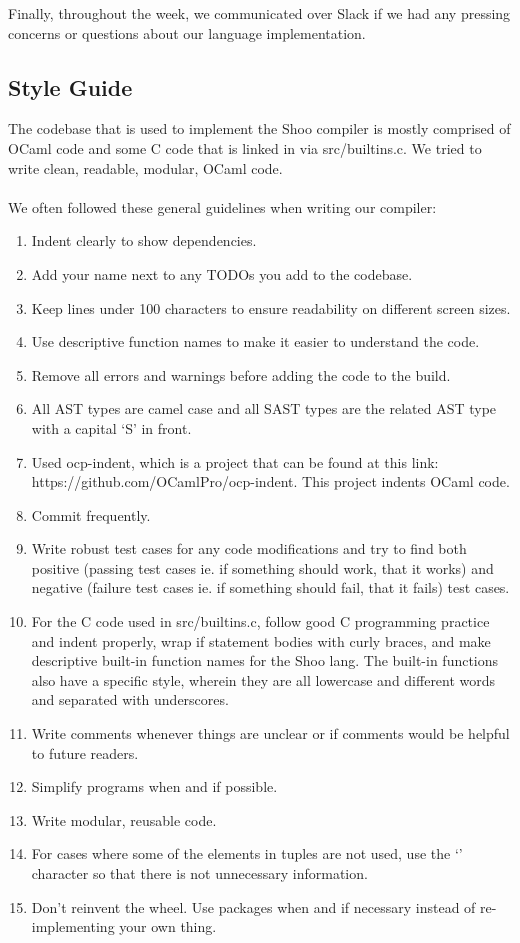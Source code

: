 \documentclass[12pt]{article}
\begin{document}
Finally, throughout the week, we communicated over Slack if we had any pressing concerns or questions about our language implementation. 

\subsection{Style Guide}
The codebase that is used to implement the Shoo compiler is mostly comprised of OCaml code and some C code that is linked in via src/builtins.c. We tried to write clean, readable, modular, OCaml code. 
\\ \\
We often followed these general guidelines when writing our compiler:
\begin{enumerate}
\item Indent clearly to show dependencies.
\item Add your name next to any TODOs you add to the codebase.
\item Keep lines under 100 characters to ensure readability on different screen sizes. 
\item Use descriptive function names to make it easier to understand the code.
\item Remove all errors and warnings before adding the code to the build.
\item All AST types are camel case and all SAST types are the related AST type with a capital ‘S’ in front.
\item Used ocp-indent, which is a project that can be found at this link:
\\ https://github.com/OCamlPro/ocp-indent. This project indents OCaml code.
\item Commit frequently.
\item Write robust test cases for any code modifications and try to find both positive (passing test cases ie. if something should work, that it works) and negative (failure test cases ie. if something should fail, that it fails) test cases.
\item For the C code used in src/builtins.c, follow good C programming practice and indent properly, wrap if statement bodies with curly braces, and make descriptive built-in function names for the Shoo lang. The built-in functions also have a specific style, wherein they are all lowercase and different words and separated with underscores.
\item Write comments whenever things are unclear or if comments would be helpful to future readers.
\item Simplify programs when and if possible.
\item Write modular, reusable code.
\item For cases where some of the elements in tuples are not used, use the `\textunderscore' character so that there is not unnecessary information.
\item Don't reinvent the wheel. Use packages when and if necessary instead of re-implementing your own thing.
\end{enumerate}
\end{document}

